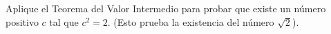 \setcounter{enumi}{47}
\item Aplique el Teorema del Valor Intermedio para probar que existe un número positivo $c$ tal que $c^2 = 2$. (Esto prueba la existencia del número $\sqrt{2}$).
